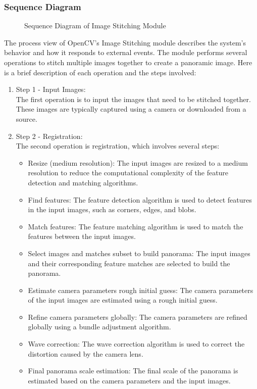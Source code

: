 \subsubsection{Sequence Diagram\label{subsubSection::SequenceDiag}}
\begin{figure}[H]
     \centering
     \caption{\label{Figure::StitchingPipeline} Sequence Diagram of Image Stitching Module} 
\end{figure}
The process view of OpenCV's Image Stitching module describes the system's behavior and how it responds to external events. The module performs several operations to stitch multiple images together to create a panoramic image. Here is a brief description of each operation and the steps involved:
\begin{enumerate}
    \item Step 1 - Input Images:\\ The first operation is to input the images that need to be stitched together. These images are typically captured using a camera or downloaded from a source.

    \item Step 2 - Registration:\\ The second operation is registration, which involves several steps:
    \begin{itemize}
        \item Resize (medium resolution): The input images are resized to a medium resolution to reduce the computational complexity of the feature detection and matching algorithms.
        \item Find features: The feature detection algorithm is used to detect features in the input images, such as corners, edges, and blobs.
        \item Match features: The feature matching algorithm is used to match the features between the input images.
        \item Select images and matches subset to build panorama: The input images and their corresponding feature matches are selected to build the panorama.
        \item Estimate camera parameters rough initial guess: The camera parameters of the input images are estimated using a rough initial guess.
        \item Refine camera parameters globally: The camera parameters are refined globally using a bundle adjustment algorithm.
        \item Wave correction: The wave correction algorithm is used to correct the distortion caused by the camera lens.
        \item Final panorama scale estimation: The final scale of the panorama is estimated based on the camera parameters and the input images.
    \end{itemize}


\end{enumerate}
